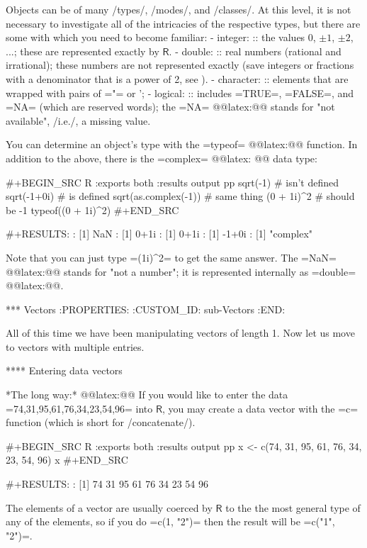 Objects can be of many /types/, /modes/, and /classes/. At this level,
it is not necessary to investigate all of the intricacies of the
respective types, but there are some with which you need to become
familiar:
- integer: :: the values \(0\), \(\pm1\), \(\pm2\), ...; these are
              represented exactly by \(\mathsf{R}\).
- double: :: real numbers (rational and irrational); these numbers are
             not represented exactly (save integers or fractions with
             a denominator that is a power of 2, see
             \cite{Venables2010}).
- character: :: elements that are wrapped with pairs of ="= or ';
- logical: :: includes =TRUE=, =FALSE=, and =NA= (which are reserved
              words); the =NA= @@latex:@@ stands
              for "not available", /i.e./, a missing value.

You can determine an object's type with the =typeof=
@@latex:@@ function. In addition to the above,
there is the =complex= @@latex:
@@ data type:

#+BEGIN_SRC R :exports both :results output pp 
sqrt(-1)              # isn't defined
sqrt(-1+0i)           # is defined
sqrt(as.complex(-1))  # same thing
(0 + 1i)^2            # should be -1
typeof((0 + 1i)^2)
#+END_SRC

#+RESULTS:
: [1] NaN
: [1] 0+1i
: [1] 0+1i
: [1] -1+0i
: [1] "complex"

Note that you can just type =(1i)^2= to get the same answer. The
=NaN= @@latex:@@ stands for "not a number"; it is
represented internally as =double= @@latex:@@.

*** Vectors
:PROPERTIES:
:CUSTOM_ID: sub-Vectors
:END:

All of this time we have been manipulating vectors of length 1. Now
let us move to vectors with multiple entries.

**** Entering data vectors

*The long way:* @@latex:@@ If you would like to enter the
data =74,31,95,61,76,34,23,54,96= into \(\mathsf{R}\), you may create
a data vector with the =c= function (which is short for
/concatenate/).

#+BEGIN_SRC R :exports both :results output pp 
x <- c(74, 31, 95, 61, 76, 34, 23, 54, 96)
x
#+END_SRC

#+RESULTS:
: [1] 74 31 95 61 76 34 23 54 96

The elements of a vector are usually coerced by \(\mathsf{R}\) to the
the most general type of any of the elements, so if you do =c(1, "2")=
then the result will be =c("1", "2")=.

